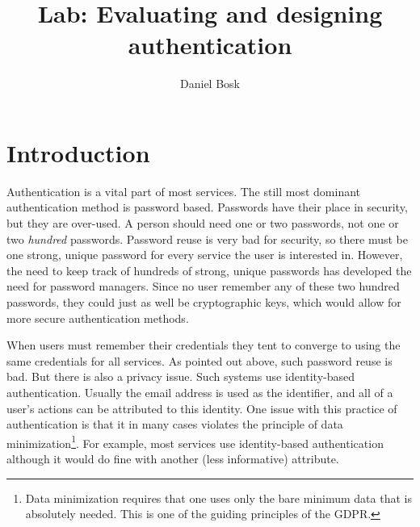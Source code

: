 \title{%
  Lab: Evaluating and designing authentication
}
\author{Daniel Bosk}


\mode*

\begin{abstract}
  
\end{abstract}


\section{Introduction}

Authentication is a vital part of most services.
The still most dominant authentication method is password based.
Passwords have their place in security, but they are over-used.
A person should need one or two passwords, not one or two \emph{hundred} 
passwords.
Password reuse is very bad for security, so there must be one strong, unique 
password for every service the user is interested in.
However, the need to keep track of hundreds of strong, unique passwords has 
developed the need for password managers.
Since no user remember any of these two hundred passwords, they could just as 
well be cryptographic keys, which would allow for more secure authentication 
methods.

When users must remember their credentials they tent to converge to using the 
same credentials for all services.
As pointed out above, such password reuse is bad.
But there is also a privacy issue.
Such systems use identity-based authentication.
Usually the email address is used as the identifier, and all of a user's 
actions can be attributed to this identity.
One issue with this practice of authentication is that it in many cases 
violates the principle of data minimization\footnote{%
  Data minimization requires that one uses only the bare minimum data that is 
  absolutely needed.
  This is one of the guiding principles of the \ac{GDPR}.
}.
For example, most services use identity-based authentication although it would 
do fine with another (less informative) attribute.

